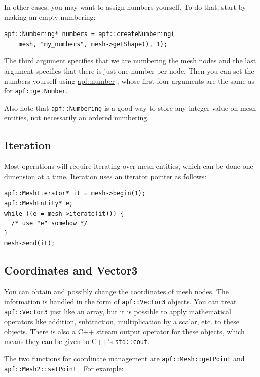 \documentclass{article}
\begin{document}
In other cases, you may want to assign numbers yourself.
To do that, start by making an empty numbering:

\begin{lstlisting}
apf::Numbering* numbers = apf::createNumbering(
    mesh, "my_numbers", mesh->getShape(), 1);
\end{lstlisting}

The third argument specifies that we are numbering the mesh
nodes and the last argument specifies that there is just one
number per node.
Then you can set the numbers yourself using
\href{http://scorec.rpi.edu/~dibanez/core/namespaceapf.html#a3a8fafe58c4c2ec60a572692ffbaa1fd}{apf::number}
, whose first four arguments are the same as for
\texttt{apf::getNumber}.

Also note that \texttt{apf::Numbering} is a good way to store
any integer value on mesh entities, not necessarily an
ordered numbering.

\subsection{Iteration}

Most operations will require iterating over mesh entities,
which can be done one dimension at a time.
Iteration uses an iterator pointer as follows:

\begin{lstlisting}
apf::MeshIterator* it = mesh->begin(1);
apf::MeshEntity* e;
while ((e = mesh->iterate(it))) {
  /* use "e" somehow */
}
mesh->end(it);
\end{lstlisting}

\subsection{Coordinates and Vector3}

You can obtain and possibly change the coordinates of mesh nodes.
The information is handled in the form of
\href{http://scorec.rpi.edu/~dibanez/core/classapf_1_1Vector3.html#_details}{\texttt{apf::Vector3}}
objects.
You can treat \texttt{apf::Vector3} just like an array, but it is
possible to apply mathematical operators like addition, subtraction,
multiplication by a scalar, etc. to these objects.
There is also a C++ stream output operator for these objects, which
means they can be given to C++'s \texttt{std::cout}.

The two functions for coordinate management are
\href{http://scorec.rpi.edu/~dibanez/core/classapf_1_1Mesh.html#a27c491ae08a8248e292179dbd7dacb39}{\texttt{apf::Mesh::getPoint}}
and
\href{http://scorec.rpi.edu/~dibanez/core/classapf_1_1Mesh2.html#a39ad215b2b6d6b75d55819fbbc138f57}{\texttt{apf::Mesh2::setPoint}}
.
For example:
\end{document}
